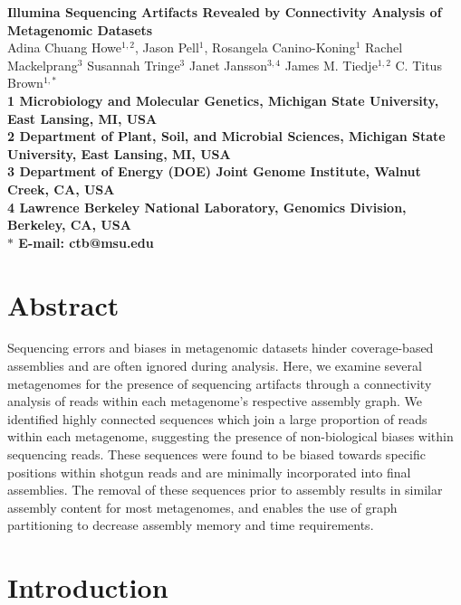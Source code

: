 \documentclass[10pt]{article}
\date{}
\begin{document}
\begin{flushleft}
{\Large \textbf{Illumina Sequencing Artifacts Revealed by Connectivity
    Analysis of Metagenomic Datasets} }
\\
Adina Chuang Howe$^{1,2}$, 
Jason Pell$^{1}$,
Rosangela Canino-Koning$^{1}$
Rachel Mackelprang$^{3}$
Susannah Tringe$^{3}$
Janet Jansson$^{3,4}$ 
James M. Tiedje$^{1,2}$
C. Titus Brown$^{1,\ast}$
\\
\bf{1} Microbiology and Molecular Genetics, Michigan State University, East Lansing, MI, USA
\\
\bf{2} Department of Plant, Soil, and Microbial Sciences, Michigan State University, East Lansing, MI, USA
\\
\bf{3} Department of Energy (DOE) Joint Genome Institute, Walnut Creek, CA, USA
\\
\bf{4} Lawrence Berkeley National Laboratory, Genomics Division, Berkeley, CA, USA
\\
$\ast$ E-mail: ctb@msu.edu
\end{flushleft}

\section*{Abstract}

Sequencing errors and biases in metagenomic datasets hinder coverage-based assemblies and are often ignored during analysis.  Here, we
examine several metagenomes for the presence of sequencing
artifacts through a connectivity analysis of reads within
each metagenome's respective assembly graph.  We
identified highly connected sequences which join a large proportion of
reads within each metagenome, suggesting the presence of
non-biological biases within sequencing reads.  These sequences were
found to be biased towards specific positions within shotgun reads and
are minimally incorporated into final assemblies.  The removal of
these sequences prior to assembly results in similar assembly content
for most metagenomes, and enables the use of graph partitioning
to decrease assembly memory and time requirements.

\section*{Introduction}
\end{document}
